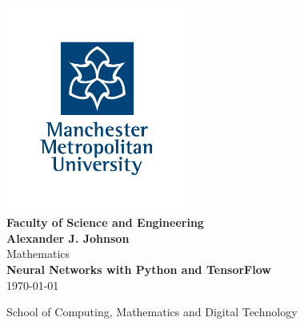 \begin{titlepage}
\begin{center}
    \vspace{2cm}
    \includegraphics[width = 6cm]{MMU_Logo_Colour.pdf}\\
    \textbf{\Large Faculty of Science and Engineering}\\
    \vspace{2cm}
    \textbf{\LARGE Alexander J. Johnson}\\
    \vspace{1cm}
    {\Large Mathematics}\\
    \vspace{1cm}
    \textbf{\LARGE Neural Networks with Python and TensorFlow}\\
    \vspace{1cm}
    {\Large\today}\\
    
    \vfill
    
    {\large School of Computing, Mathematics and Digital Technology}
\end{center}
\end{titlepage}

